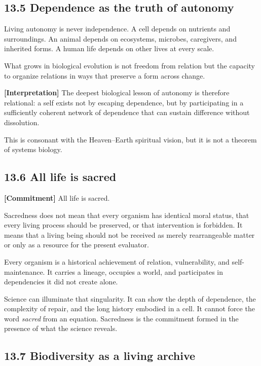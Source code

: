 \documentclass[
  11pt,
]{article}
\begin{document}
\subsection{13.5 Dependence as the truth of
autonomy}\label{dependence-as-the-truth-of-autonomy}

Living autonomy is never independence. A cell depends on nutrients and
surroundings. An animal depends on ecosystems, microbes, caregivers, and
inherited forms. A human life depends on other lives at every scale.

What grows in biological evolution is not freedom from relation but the
capacity to organize relations in ways that preserve a form across
change.

\textbf{{[}Interpretation{]}} The deepest biological lesson of autonomy
is therefore relational: a self exists not by escaping dependence, but
by participating in a sufficiently coherent network of dependence that
can sustain difference without dissolution.

This is consonant with the Heaven--Earth spiritual vision, but it is not
a theorem of systems biology.

\subsection{13.6 All life is sacred}\label{all-life-is-sacred}

\textbf{{[}Commitment{]}} All life is sacred.

Sacredness does not mean that every organism has identical moral status,
that every living process should be preserved, or that intervention is
forbidden. It means that a living being should not be received as merely
rearrangeable matter or only as a resource for the present evaluator.

Every organism is a historical achievement of relation, vulnerability,
and self-maintenance. It carries a lineage, occupies a world, and
participates in dependencies it did not create alone.

Science can illuminate that singularity. It can show the depth of
dependence, the complexity of repair, and the long history embodied in a
cell. It cannot force the word \emph{sacred} from an equation.
Sacredness is the commitment formed in the presence of what the science
reveals.

\subsection{13.7 Biodiversity as a living
archive}\label{biodiversity-as-a-living-archive}
\end{document}
